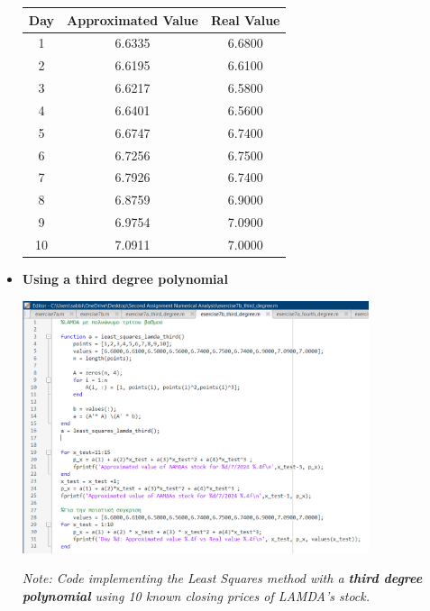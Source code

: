 \documentclass{article}
\begin{document}
\begin{itemize}
\begin{center}
    
    \centering
    \begin{tabular}{@{}ccc@{}}
        \toprule
        \textbf{Day} & \textbf{Approximated Value} & \textbf{Real Value} \\ \midrule
        1 & 6.6335 & 6.6800 \\
        2 & 6.6195 & 6.6100 \\
        3 & 6.6217 & 6.5800 \\
        4 & 6.6401 & 6.5600 \\
        5 & 6.6747 & 6.7400 \\
        6 & 6.7256 & 6.7500 \\
        7 & 6.7926 & 6.7400 \\
        8 & 6.8759 & 6.9000 \\
        9 & 6.9754 & 7.0900 \\
        10 & 7.0911 & 7.0000 \\ \bottomrule
    \end{tabular}
    \end{center}
    

  \item \textbf{Using a third degree polynomial}
  \begin{tcolorbox}[colback=red!10, colframe=gray!80, width=\textwidth, sharp corners]
    \centering 
    \includegraphics[width=0.8\textwidth,height=0.38\textheight]{Exercise7bThird.png} 

    \vspace{0.1cm}
    \small\textit{Note: Code implementing the Least Squares method with a \textbf{third degree polynomial} using 10 known closing prices of LAMDA's stock. }
\end{tcolorbox}


\end{itemize}
\end{document}
